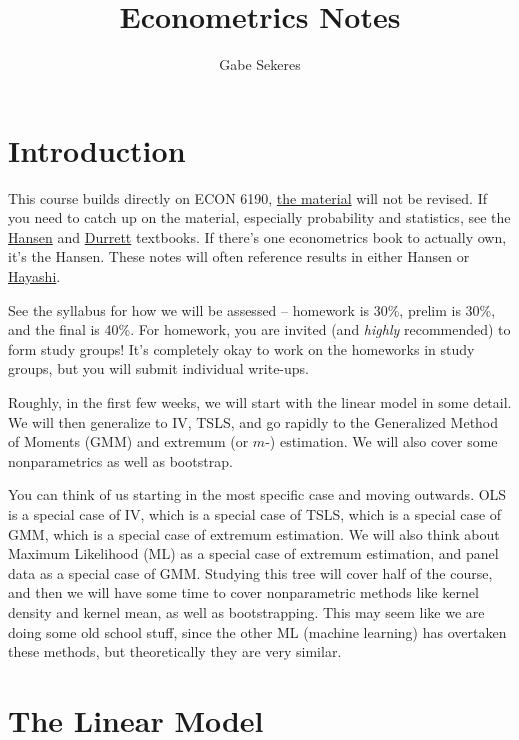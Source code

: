 \documentclass[10pt]{article}
\title{Econometrics Notes}
\author{Gabe Sekeres}
\begin{document}
\maketitle

\tableofcontents
\newpage


\section*{Introduction}

This course builds directly on ECON 6190, \href{https://gabesekeres.com/resources/private/fall_2024/econ_6190_notes.pdf}{the material} will not be revised. If you need to catch up on the material, especially probability and statistics, see the \href{https://users.ssc.wisc.edu/~bhansen/econometrics/}{Hansen} and \href{https://services.math.duke.edu/~rtd/PTE/PTE5_011119.pdf}{Durrett} textbooks. If there's one econometrics book to actually own, it's the Hansen. These notes will often reference results in either Hansen or \href{https://press.princeton.edu/books/hardcover/9780691010182/econometrics}{Hayashi}.

 See the syllabus for how we will be assessed -- homework is 30\%, prelim is 30\%, and the final is 40\%. For homework, you are invited (and \emph{highly} recommended) to form study groups! It's completely okay to work on the homeworks in study groups, but you will submit individual write-ups.

Roughly, in the first few weeks, we will start with the linear model in some detail. We will then generalize to IV, TSLS, and go rapidly to the Generalized Method of Moments (GMM) and extremum (or $m$-) estimation. We will also cover some nonparametrics as well as bootstrap.

You can think of us starting in the most specific case and moving outwards. OLS is a special case of IV, which is a special case of TSLS, which is a special case of GMM, which is a special case of extremum estimation. We will also think about Maximum Likelihood (ML) as a special case of extremum estimation, and panel data as a special case of GMM. Studying this tree will cover half of the course, and then we will have some time to cover nonparametric methods like kernel density and kernel mean, as well as bootstrapping. This may seem like we are doing some old school stuff, since the other ML (machine learning) has overtaken these methods, but theoretically they are very similar.

\section{The Linear Model}
\end{document}
